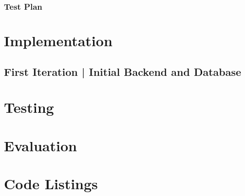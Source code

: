 \documentclass[11pt,a4paper]{article}
\begin{document}
\subsubsection{Test Plan}

\pagebreak

\section{Implementation}

\subsection{First Iteration | Initial Backend and Database}



\pagebreak

\section{Testing}

\section{Evaluation}

\section{Code Listings}
\end{document}
